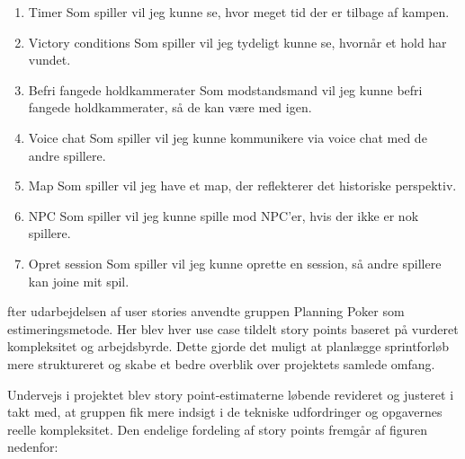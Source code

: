 \begin{enumerate}
    \item Timer  
    Som spiller vil jeg kunne se, hvor meget tid der er tilbage af kampen.

    \item Victory conditions  
    Som spiller vil jeg tydeligt kunne se, hvornår et hold har vundet.

    \item Befri fangede holdkammerater  
    Som modstandsmand vil jeg kunne befri fangede holdkammerater, så de kan være med igen.

    \item Voice chat  
    Som spiller vil jeg kunne kommunikere via voice chat med de andre spillere.

    \item Map  
    Som spiller vil jeg have et map, der reflekterer det historiske perspektiv.

    \item NPC  
    Som spiller vil jeg kunne spille mod NPC'er, hvis der ikke er nok spillere.

    \item Opret session  
    Som spiller vil jeg kunne oprette en session, så andre spillere kan joine mit spil.
\end{enumerate}

fter udarbejdelsen af user stories anvendte gruppen Planning Poker som estimeringsmetode. Her blev hver use case tildelt story points baseret på vurderet kompleksitet og arbejdsbyrde. Dette gjorde det muligt at planlægge sprintforløb mere struktureret og skabe et bedre overblik over projektets samlede omfang.

Undervejs i projektet blev story point-estimaterne løbende revideret og justeret i takt med, at gruppen fik mere indsigt i de tekniske udfordringer og opgavernes reelle kompleksitet. Den endelige fordeling af story points fremgår af figuren nedenfor:

